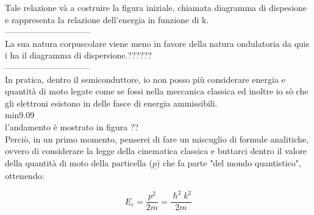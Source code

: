  Tale relazione và a costruire la figura iniziale, chiamata diagramma di dispesione e rappresenta la relazione dell'energia in funzione di k.\\
 ------------------------------\\
La sua natura corpuscolare viene meno in favore della natura ondulatoria da quis i ha il diagramma di dispersione.??????\\
 ------------------------------\\
In pratica, dentro il semiconduttore, io non posso più considerare energia e quantità di moto legate come se fossi nella meccanica classica ed inoltre io sò che gli elettroni esistono in delle fasce di energia ammissibili. \\
min9.09\\
l'andamento è mostrato in figura ??\\
Perciò, in un primo momento, penserei di fare un miscuglio di formule analitiche, ovvero di considerare la legge della cinematica classica e buttarci dentro il valore della quantità di moto della particella ($\underline{p}$) che fa parte "del mondo quantistico", ottenendo:

\begin{equation}
    E_c=\dfrac{p^2}{2m}=\dfrac{\hslash^2k^2}{2m}
\end{equation}


